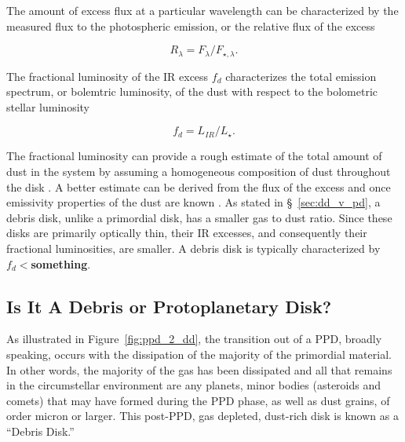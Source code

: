         The amount of excess flux at a particular wavelength can be characterized by the measured flux to the photospheric emission, or the relative flux of the excess
        
        \begin{equation}\label{eq:rel_excess}
        R_\lambda = F_\lambda / F_{\star,\lambda}.
        \end{equation}
        
        \noindent The fractional luminosity of the IR excess $f_d$ characterizes the total emission spectrum, or bolemtric luminosity, of the dust with respect to the bolometric stellar luminosity
        
        \begin{equation}\label{eq:rel_excess}
        f_d = L_{IR}/L_{\star}.
        \end{equation}
        
        \noindent The fractional luminosity can provide a rough estimate of the total amount of dust in the system by assuming a homogeneous composition of dust throughout the disk \citep{Wyatt2008}. A better estimate can be derived from the flux of the excess and once emissivity properties of the dust are known \citep{Beckwith2000}. As stated in \S~\ref{sec:dd_v_pd}, a debris disk, unlike a primordial disk, has a smaller gas to dust ratio. Since these disks are primarily optically thin, their IR excesses, and consequently their fractional luminosities, are smaller. A debris disk is typically characterized by \textbf{$f_d<$something}.
    
    \subsection{Is It A Debris or Protoplanetary Disk?}
    
    As illustrated in Figure~\ref{fig:ppd_2_dd}, the transition out of a PPD, broadly speaking, occurs with the dissipation of the majority of the primordial material. In other words, the majority of the gas has been dissipated and all that remains in the circumstellar environment are any planets, minor bodies (asteroids and comets) that may have formed during the PPD phase, as well as dust grains, of order micron or larger. This post-PPD, gas depleted, dust-rich disk is known as a ``Debris Disk.'' %
    
